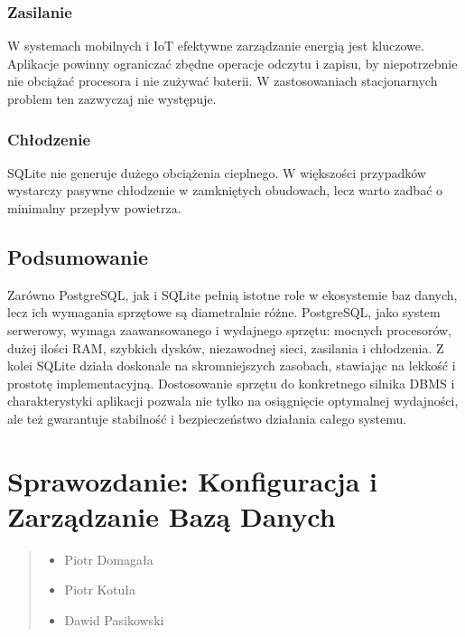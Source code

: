 \documentclass[a4paper,11pt,polish]{sphinxmanual}
\begin{document}
\subsection{Zasilanie}
\label{\detokenize{Sprzet-dla-bazy-danych/source/SprzetDlaBazyDanych:id5}}
\sphinxAtStartPar
W systemach mobilnych i IoT efektywne zarządzanie energią jest kluczowe. Aplikacje powinny ograniczać zbędne operacje odczytu i zapisu, by niepotrzebnie nie obciążać procesora i nie zużywać baterii. W zastosowaniach stacjonarnych problem ten zazwyczaj nie występuje.


\subsection{Chłodzenie}
\label{\detokenize{Sprzet-dla-bazy-danych/source/SprzetDlaBazyDanych:id6}}
\sphinxAtStartPar
SQLite nie generuje dużego obciążenia cieplnego. W większości przypadków wystarczy pasywne chłodzenie w zamkniętych obudowach, lecz warto zadbać o minimalny przepływ powietrza.


\section{Podsumowanie}
\label{\detokenize{Sprzet-dla-bazy-danych/source/SprzetDlaBazyDanych:podsumowanie}}
\sphinxAtStartPar
Zarówno PostgreSQL, jak i SQLite pełnią istotne role w ekosystemie baz danych, lecz ich wymagania sprzętowe są diametralnie różne. PostgreSQL, jako system serwerowy, wymaga zaawansowanego i wydajnego sprzętu: mocnych procesorów, dużej ilości RAM, szybkich dysków, niezawodnej sieci, zasilania i chłodzenia.
Z kolei SQLite działa doskonale na skromniejszych zasobach, stawiając na lekkość i prostotę implementacyjną.
Dostosowanie sprzętu do konkretnego silnika DBMS i charakterystyki aplikacji pozwala nie tylko na osiągnięcie optymalnej wydajności, ale też gwarantuje stabilność i bezpieczeństwo działania całego systemu.

\sphinxstepscope


\chapter{Sprawozdanie: Konfiguracja i Zarządzanie Bazą Danych}
\label{\detokenize{Konfiguracja_baz_danych/Konfiguracja_baz_danych:sprawozdanie-konfiguracja-i-zarzadzanie-baza-danych}}\label{\detokenize{Konfiguracja_baz_danych/Konfiguracja_baz_danych::doc}}\begin{quote}\begin{description}
\begin{itemize}
\item {} 
\sphinxAtStartPar
Piotr Domagała

\item {} 
\sphinxAtStartPar
Piotr Kotuła

\item {} 
\sphinxAtStartPar
Dawid Pasikowski

\end{itemize}

\end{description}\end{quote}
\end{document}
